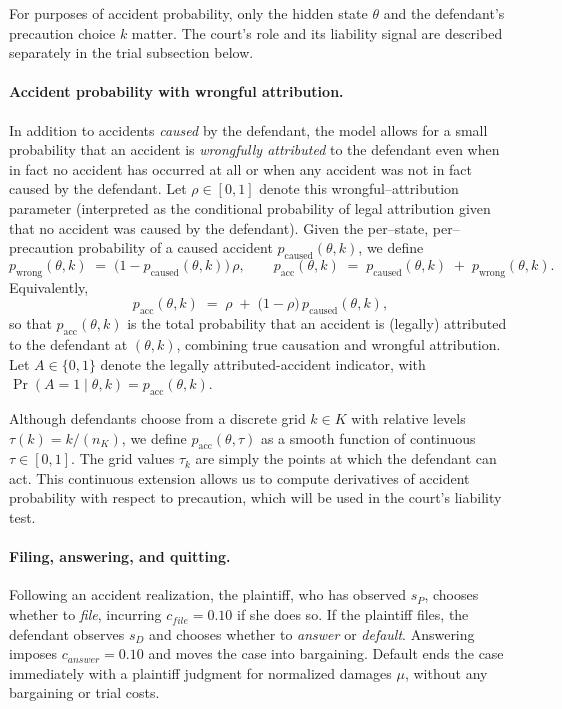 \documentclass{article}
\begin{document}
For purposes of accident probability, only the hidden state $\theta$ and the defendant’s precaution choice $k$ matter. The court’s role and its liability signal are described separately in the trial subsection below.

\paragraph{Accident probability with wrongful attribution.}
In addition to accidents \emph{caused} by the defendant, the model allows for a small probability that an accident is \emph{wrongfully attributed} to the defendant even when in fact no accident has occurred at all or when any accident was not in fact caused by the defendant. Let $\rho\in[0,1]$ denote this wrongful–attribution parameter (interpreted as the conditional probability of legal attribution given that no accident was caused by the defendant). Given the per–state, per–precaution probability of a caused accident $p_{\mathrm{caused}}(\theta,k)$, we define
\[
p_{\mathrm{wrong}}(\theta,k)\;=\;\bigl(1 - p_{\mathrm{caused}}(\theta,k)\bigr)\,\rho,
\qquad
p_{\mathrm{acc}}(\theta,k)\;=\;p_{\mathrm{caused}}(\theta,k)\;+\;p_{\mathrm{wrong}}(\theta,k).
\]
Equivalently,
\[
p_{\mathrm{acc}}(\theta,k)
\;=\;\rho \;+\; \bigl(1-\rho\bigr)\,p_{\mathrm{caused}}(\theta,k),
\]
so that $p_{\mathrm{acc}}(\theta,k)$ is the total probability that an accident is (legally) attributed to the defendant at $(\theta,k)$, combining true causation and wrongful attribution.
Let $A\in\{0,1\}$ denote the legally attributed-accident indicator, with $\Pr(A=1\mid \theta,k)=p_{\mathrm{acc}}(\theta,k)$.

Although defendants choose from a discrete grid $k \in K$ with relative levels $\tau(k)=k/(n_K)$, we define $p_{\mathrm{acc}}(\theta,\tau)$ as a smooth function of continuous $\tau\in[0,1]$. The grid values $\tau_k$ are simply the points at which the defendant can act. This continuous extension allows us to compute derivatives of accident probability with respect to precaution, which will be used in the court’s liability test.

\paragraph{Filing, answering, and quitting.}
Following an accident realization, the plaintiff, who has observed $s_P$, chooses whether to \emph{file}, incurring $c_{file}=0.10$ if she does so. If the plaintiff files, the defendant observes $s_D$ and chooses whether to \emph{answer} or \emph{default}. Answering imposes $c_{answer}=0.10$ and moves the case into bargaining. Default ends the case immediately with a plaintiff judgment for normalized damages $\mu$, without any bargaining or trial costs.
\end{document}
